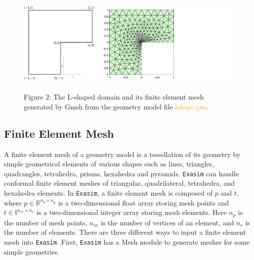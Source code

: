 \documentclass[11pt]{article}
\begin{document}
\begin{figure}[htbp]
\begin{center}
\includegraphics[scale=1.54]{lshape.png} \\
\label{fig2}
\end{center}
Figure 2:   The L-shaped domain and its finite element mesh generated by Gmsh from the geometry model file \textcolor{orange}{lshape.geo}. 
\end{figure}

\subsection{Finite Element Mesh}

A finite element mesh of a geometry model is a tessellation of its geometry by simple geometrical elements of various shapes such as lines, triangles, quadrangles, tetrahedra, prisms, hexahedra and pyramids. \texttt{Exasim} can handle conformal finite element meshes of triangular, quadrilateral, tetrahedra, and hexahedra elements.  In \texttt{Exasim}, a finite element mesh is composed of $p$ and $t$, where $p \in \mathbb{R}^{n_d \times n_p}$ is a two-dimensional float array storing mesh points and $t \in \mathbb{I}^{n_{ve} \times n_e}$  is a two-dimensional integer array storing mesh elements. Here $n_p$ is the number of mesh points, $n_{ve}$ is the number of vertices of an element, and $n_e$ is the number of elements. There are three different ways to input a finite element mesh into \texttt{Exasim}. First, \texttt{Exasim} has a Mesh module to generate meshes for some simple geometries.
\end{document}
